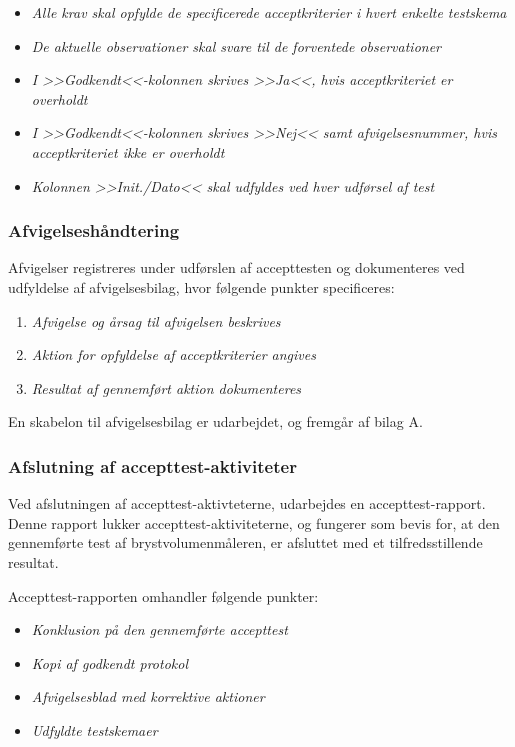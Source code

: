 			 \begin{itemize}
				\item \textit{Alle krav skal opfylde de specificerede acceptkriterier i hvert enkelte testskema}
				\item \textit{De aktuelle observationer skal svare til de forventede observationer}
				\item \textit{I >>Godkendt<<-kolonnen skrives >>Ja<<, hvis acceptkriteriet er overholdt} 
				\item \textit{I >>Godkendt<<-kolonnen skrives >>Nej<< samt afvigelsesnummer, hvis acceptkriteriet ikke er overholdt}  \item \textit{Kolonnen >>Init./Dato<< skal udfyldes ved hver udførsel af test}
			\end{itemize}
			
			\subsubsection{Afvigelseshåndtering}	
			Afvigelser registreres under udførslen af accepttesten og dokumenteres ved udfyldelse af afvigelsesbilag, hvor følgende punkter specificeres: 
			
			\begin{enumerate}[label=\alph*)]
				\item \textit{Afvigelse og årsag til afvigelsen beskrives}
				\item \textit{Aktion for opfyldelse af acceptkriterier angives}
				\item \textit{Resultat af gennemført aktion dokumenteres}	
			\end{enumerate}
			
			En skabelon til afvigelsesbilag er udarbejdet, og fremgår af bilag A. 
			
			\subsubsection{Afslutning af accepttest-aktiviteter}
			Ved afslutningen af accepttest-aktivteterne, udarbejdes en accepttest-rapport. Denne rapport lukker accepttest-aktiviteterne, og fungerer som bevis for, at den gennemførte test af brystvolumenmåleren, er afsluttet med et tilfredsstillende resultat. 
			
			Accepttest-rapporten omhandler følgende punkter: 
			\begin{itemize}
				\item \textit{Konklusion på den gennemførte accepttest}
				\item \textit{Kopi af godkendt protokol}
				\item \textit{Afvigelsesblad med korrektive aktioner}
				\item \textit{Udfyldte testskemaer}
			\end{itemize}
		
